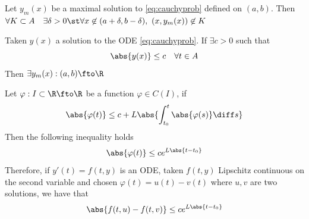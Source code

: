 \documentclass[../mmf.tex]{subfiles}
\begin{document}
\begin{thm}
	Let $y_m(x)$ be a maximal solution to \eqref{eq:cauchyprob} defined on $(a,b)$. Then $\forall K\subset A\quad\exists\delta>0\st\forall x\not\in(a+\delta,b-\delta),\ (x,y_m(x))\not\in K$
\end{thm}
\begin{thm}
	Taken $y(x)$ a solution to the ODE \eqref{eq:cauchyprob}. If $\exists c>0$ such that
	\begin{equation*}
		\abs{y(x)}\le c\quad\forall t\in A
	\end{equation*}
	Then $\exists y_m(x):(a,b)\fto\R$
\end{thm}
\begin{lem}
	Let $\varphi:I\subset\R\fto\R$ be a function $\varphi\in C(I)$, if
	\begin{equation*}
		\abs{\varphi(t)}\le c+L\abs{\int_{t_0}^{t}\abs{\varphi(s)}\diff s}
	\end{equation*}
	Then the following inequality holds
	\begin{equation*}
		\abs{\varphi(t)}\le ce^{L\abs{t-t_0}}
	\end{equation*}
	Therefore, if $y'(t)=f(t,y)$ is an ODE, taken $f(t,y)$ Lipschitz continuous on the second variable and chosen $\varphi(t)=u(t)-v(t)$ where $u,v$ are two solutions, we have that
	\begin{equation*}
		\abs{f(t,u)-f(t,v)}\le ce^{L\abs{t-t_0}}
	\end{equation*}
\end{lem}
\end{document}
